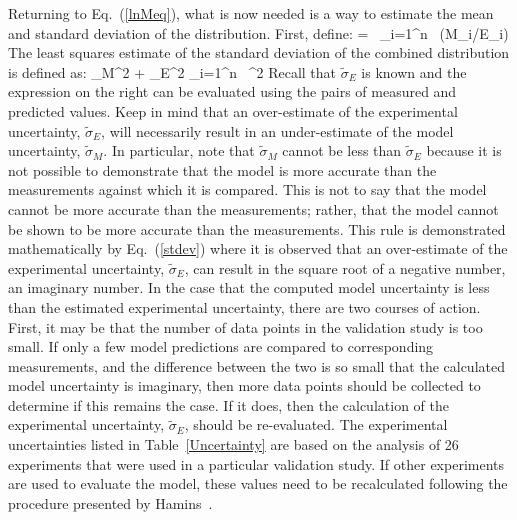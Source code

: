 Returning to Eq.~(\ref{lnMeq}), what is now needed is a way to estimate the mean and standard deviation of the distribution. First, define:
\be
    =  \, \sum_{i=1}^n \, \ln (M_i/E_i)
\ee
The least squares estimate of the standard deviation of the combined distribution is defined as:
\be
   \widetilde{\sigma}_M^2 + \widetilde{\sigma}_E^2 \approx {} \sum_{i=1}^n \,
   ^2 \label{stdev}
\ee
Recall that $\widetilde{\sigma}_E$ is known and the expression on the right can be evaluated using the pairs of measured and
predicted values. Keep in mind that an over-estimate of the experimental uncertainty, $\widetilde{\sigma}_E$, will necessarily result in an under-estimate of the
model uncertainty, $\widetilde{\sigma}_M$. In particular, note that $\widetilde{\sigma}_M$ cannot be less than
$\widetilde{\sigma}_E$ because it is not possible to demonstrate that the model is more accurate than the measurements against which it is compared. This is not to say that the model
cannot be more accurate than the measurements; rather, that the model cannot be shown to be more accurate than the measurements. This rule is demonstrated
mathematically by Eq.~(\ref{stdev}) where it is observed that an over-estimate of the experimental uncertainty, $\widetilde{\sigma}_E$, can result in
the square root of a negative number, an imaginary number. In the case that the computed model uncertainty is less than the estimated experimental uncertainty, there are
two courses of action. First, it may be that the number of data points in the validation study is too small. If only a few model predictions are compared to corresponding
measurements, and the difference between the two is so small that the calculated model uncertainty is imaginary, then more data points should be collected
to determine if this remains the case. If it does, then
the calculation of the experimental uncertainty, $\widetilde{\sigma}_E$, should be re-evaluated. The experimental uncertainties listed in
Table~\ref{Uncertainty} are based on the analysis of 26 experiments that were used in a particular validation study. If other experiments are used to evaluate the
model, these values need to be recalculated following the procedure presented by Hamins~\cite{NUREG_1824}.

